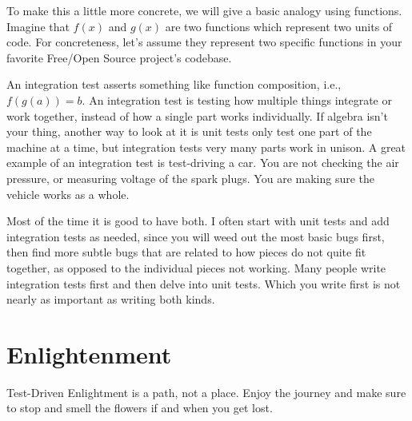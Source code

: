To make this a little more concrete, we will give a basic analogy using
functions. Imagine that $f(x)$ and $g(x)$ are two functions which represent two units of code. For
concreteness, let's assume they represent two specific functions in your
favorite Free/Open Source project's codebase.

An integration test asserts something like function composition, i.e., $f(g(a)) =
b$. An integration test is testing how multiple
things integrate or work together, instead of how a single part works
individually. If algebra isn't your thing, another way to look at it is unit
tests only test one part of the machine at a time, but integration tests very
many parts work in unison. A great example of an integration test is test-driving a car.
You are not checking the air pressure, or measuring voltage of the spark plugs.
You are making sure the vehicle works as a whole.

Most of the time it is good to have both. I often start with unit tests and add
integration tests as needed, since you will weed out the most basic bugs first,
then find more subtle bugs that are related to how pieces do not quite fit
together, as opposed to the individual pieces not working. Many people write
integration tests first and then delve into unit tests. Which you write first
is not nearly as important as writing both kinds.

\section*{Enlightenment}

Test-Driven Enlightment is a path, not a place. Enjoy the journey and make sure
to stop and smell the flowers if and when you get lost.
